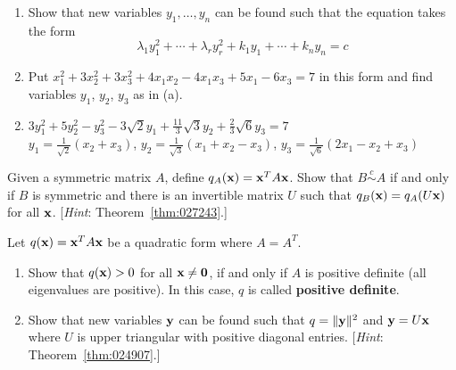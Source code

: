 \begin{multicols}{2}
\begin{ex}
\begin{enumerate}[label={\alph*.}]
\item Show that new variables $y_{1}, \dots, y_{n}$ can be found such that the equation takes the form 
\begin{equation*}
\lambda_{1}y_{1}^2 + \cdots + \lambda_{r}y_{r}^2 + k_{1}y_{1} + \cdots + k_{n}y_{n} = c
\end{equation*}

\item Put $x_{1}^2 + 3x_{2}^2 + 3x_{3}^2 + 4x_{1}x_{2} - 4x_{1}x_{3} + 5x_{1} - 6x_{3} = 7$ in this form and find variables $y_{1}$, $y_{2}$, $y_{3}$ as in (a).

\end{enumerate}
\begin{sol}
\begin{enumerate}[label={\alph*.}]
\setcounter{enumi}{1}
\item $3y_{1}^2 + 5y_{2}^2 - y_{3}^2 - 3\sqrt{2}y_{1} + \frac{11}{3}\sqrt{3}y_{2} + \frac{2}{3}\sqrt{6}y_{3} = 7$ \\
$y_{1} = \frac{1}{\sqrt{2}}(x_{2} + x_{3})$, $y_{2} = \frac{1}{\sqrt{3}}(x_{1} + x_{2} - x_{3})$, $y_{3} = \frac{1}{\sqrt{6}}(2x_{1} - x_{2} + x_{3})$


\end{enumerate}
\end{sol}
\end{ex}

\columnbreak 
\begin{ex}
Given a symmetric matrix $A$, define $q_{A}(\textbf{x}) = \textbf{x}^{T}A\textbf{x}$. Show that $B \stackrel{c}{\sim} A$ if and only if $B$ is symmetric and there is an invertible matrix $U$ such that $q_{B}(\textbf{x}) = q_{A}(U\textbf{x})$ for all $\textbf{x}$. [\textit{Hint}: Theorem~\ref{thm:027243}.]
\end{ex}

\begin{ex}
Let $q(\textbf{x}) = \textbf{x}^{T}A\textbf{x}$ be a quadratic form where $A = A^{T}$.


\begin{enumerate}[label={\alph*.}]
\item Show that $q(\textbf{x}) > 0$ for all $\textbf{x} \neq \textbf{0}$, if and only if $A$ is positive definite (all eigenvalues are positive). In this case, $q$ is called \textbf{positive definite}.

\item Show that new variables $\textbf{y}$ can be found such that $q = \|\textbf{y}\|^{2}$ and $\textbf{y} = U\textbf{x}$ where $U$ is upper triangular with positive diagonal entries. [\textit{Hint}: Theorem~\ref{thm:024907}.]


\end{enumerate}
\end{ex}
\end{multicols}
